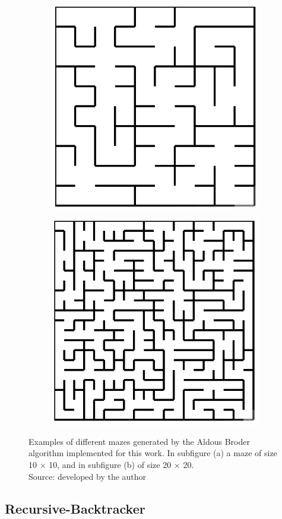 \newline
\begin{figure}[!h]
	\centering
	\begin{subfigure}{.45\textwidth}
	  \centering
	  \includegraphics[width=.6\linewidth]{aldous1010}
	  \caption{}
	  \label{fig:sub1}
	\end{subfigure}
	\begin{subfigure}{.45\textwidth}
	  \centering
	  \includegraphics[width=.6\linewidth]{aldous2020}
	  \caption{}
	  \label{fig:sub2}
	\end{subfigure}
	\caption{Examples of different mazes generated by the Aldous Broder algorithm implemented for this work. In subfigure (a) a maze of size 10 $\times$ 10, and in subfigure (b) of size 20 $\times$ 20.\\ Source: developed by the author}
	\label{fig:test}
	\end{figure}
\newpage
\subsection{Recursive-Backtracker}

